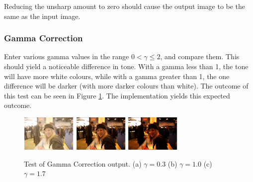 \documentclass[10pt,a4paper]{article}
\begin{document}
Reducing the unsharp amount to zero should cause the output image to be the same as the input image.


\subsubsection{Gamma Correction}
Enter various gamma values in the range $0 < \gamma \leq 2$, and compare them. This should yield a noticeable difference in tone. With a gamma less than 1,
the tone will have more white colours, while with a gamma greater than 1, the one difference will be darker (with more darker colours than white). The
outcome of this test can be seen in Figure \ref{gammatest}. The implementation yields this expected outcome.

\begin{figure}
   \centering
   \subfigure
   {
       \includegraphics[width=100px]{gammacorrectionlow}
   }
   \subfigure
   {
       \includegraphics[width=100px]{gammacorrection_normal}
   }
   \subfigure
   {
       \includegraphics[width=100px]{gammacorrectionhigh}
   }
   \caption{
       Test of Gamma Correction output. 
       (a) $\gamma = 0.3$
       (b) $\gamma = 1.0$
       (c) $\gamma = 1.7$
   }
   \label{gammatest}
\end{figure}
\end{document}
